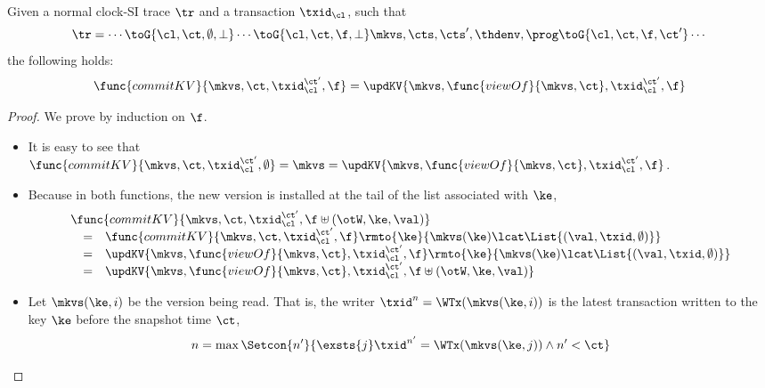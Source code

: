 \begin{lemma}
    Given a normal clock-SI trace \( \tr \) and a transaction \( \txid_\cl \), such that
    \[
        \tr = \cdots \toG{\cl, \ct, \emptyset, \perp} \cdots \toG{\cl, \ct, \f, \perp} \mkvs, \cts, \cts', \thdenv, \prog  \toG{\cl, \ct, \f, \ct'} \cdots
    \] 
    the following holds:
    \[
        \func{commitKV}{\mkvs,\ct,\txid_\cl^{\ct'},\f} = \updKV{\mkvs, \func{viewOf}{\mkvs, \ct}, \txid_\cl^{\ct'},\f} 
    \]
\end{lemma}
\begin{proof}
    We prove by induction on \( \f \).
    \begin{itemize}
        \item \caseB{\( \f = \emptyset \)}
            It is easy to see that \( \func{commitKV}{\mkvs,\ct,\txid_\cl^{\ct'},\emptyset} = \mkvs =  \updKV{\mkvs, \func{viewOf}{\mkvs, \ct}, \txid_\cl^{\ct'},\f} \).
        \item \caseI{\( \f \uplus (\otW, \ke, \val) \)}
            Because in both functions, the new version is installed at the tail of the list associated with \( \ke \),
            \[
                \begin{array}{@{}l@{}}
                \func{commitKV}{\mkvs,\ct,\txid_\cl^{\ct'},\f \uplus (\otW, \ke, \val)}  \\
                \quad \begin{array}[t]{@{}c l@{}}
                = &
                \func{commitKV}{\mkvs,\ct,\txid_\cl^{\ct'},\f}\rmto{\ke}{\mkvs(\ke) \lcat \List{(\val, \txid, \emptyset)}} \\
                = & 
                \updKV{\mkvs,\func{viewOf}{\mkvs,\ct},\txid_\cl^{\ct'},\f}\rmto{\ke}{\mkvs(\ke) \lcat \List{(\val, \txid, \emptyset)}} \\
                = & 
                \updKV{\mkvs,\func{viewOf}{\mkvs,\ct},\txid_\cl^{\ct'},\f \uplus (\otW, \ke, \val)}
                \end{array}
                \end{array}
            \]
        \item \caseI{\( \f \uplus (\otR, \ke, \val) \)}
            Let \( \mkvs(\ke,i) \) be the version being read.
            That is, the writer \( \txid^n = \WTx(\mkvs(\ke,i)) \)
            is the latest transaction written to the key \( \ke \) before the snapshot time \( \ct \),
            \[
                n = \max\Setcon{n'}{%
                    \exsts{j} 
                    \txid^{n'} = \WTx(\mkvs(\ke, j)) 
                    \land n' < \ct%
}\]
\end{itemize}
\end{proof}
